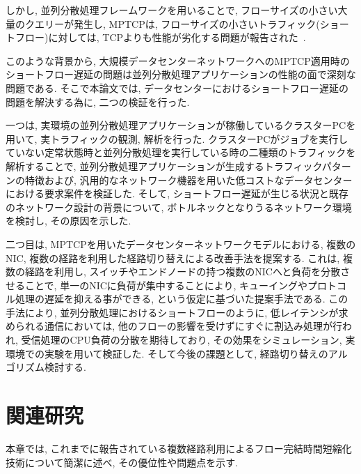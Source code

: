 \documentclass[11pt, a4paper, twocolumn]{jsarticle}
\begin{document}
しかし, 並列分散処理フレームワークを用いることで, フローサイズの小さい大量のクエリーが発生し, MPTCPは,
フローサイズの小さいトラフィック(ショートフロー)に対しては, TCPよりも性能が劣化する問題が報告された~\cite{improving}.

このような背景から, 大規模データセンターネットワークへのMPTCP適用時のショートフロー遅延の問題は並列分散処理アプリケーションの性能の面で深刻な問題である.
そこで本論文では, データセンターにおけるショートフロー遅延の問題を解決する為に, 二つの検証を行った.

一つは, 実環境の並列分散処理アプリケーションが稼働しているクラスターPCを用いて, 実トラフィックの観測, 解析を行った.
クラスターPCがジョブを実行していない定常状態時と並列分散処理を実行している時の二種類のトラフィックを解析することで,
並列分散処理アプリケーションが生成するトラフィックパターンの特徴および, 汎用的なネットワーク機器を用いた低コストなデータセンターにおける要求案件を検証した.
そして, ショートフロー遅延が生じる状況と既存のネットワーク設計の背景について, ボトルネックとなりうるネットワーク環境を検討し, その原因を示した.

二つ目は, MPTCPを用いたデータセンターネットワークモデルにおける, 複数のNIC, 複数の経路を利用した経路切り替えによる改善手法を提案する.
これは, 複数の経路を利用し, スイッチやエンドノードの持つ複数のNICへと負荷を分散させることで, 単一のNICに負荷が集中することにより,
キューイングやプロトコル処理の遅延を抑える事ができる, という仮定に基づいた提案手法である.
この手法により, 並列分散処理におけるショートフローのように, 低レイテンシが求められる通信においては, 他のフローの影響を受けずにすぐに割込み処理が行われ,
受信処理のCPU負荷の分散を期待しており, その効果をシミュレーション, 実環境での実験を用いて検証した.
そして今後の課題として, 経路切り替えのアルゴリズム検討する.


\section{関連研究}
\label{sec:related}
本章では, これまでに報告されている複数経路利用によるフロー完結時間短縮化技術について簡潔に述べ, その優位性や問題点を示す.
\end{document}

